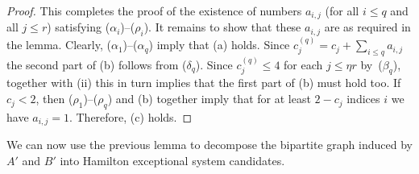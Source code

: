 \documentclass{memo-l}
\numberwithin{section}{chapter}
\numberwithin{equation}{section}
\numberwithin{firstthm}{section}
\numberwithin{figure}{section}
\begin{document}
{\begin{proof}
\medskip

This completes the proof of the existence of numbers $a_{i,j}$ (for all $i\le q$ and all $j\le r$)
satisfying ($\alpha_i$)--($\rho_i$). It remains to show that these $a_{i,j}$ are as required in the lemma.
Clearly, ($\alpha_1$)--($\alpha_q$) imply that (a) holds. Since
$c_j^{(q)}  = c_j + \sum_{i \le q} a_{i,j}$ the second part of (b) follows from ($\delta_q$).
Since $c_j^{(q)}\le 4$ for each $j\le \eta r$ by~($\beta_q$), together with (ii) this in turn implies that the
first part of (b) must hold too. If $c_j < 2$, then ($\rho_1$)--($\rho_q$) and (b) together imply that for at least
$2-c_j$ indices $i$ we have $a_{i,j} = 1$. Therefore, (c) holds.
\end{proof}




We can now use the previous lemma to decompose the bipartite graph induced by $A'$ and $B'$ into 
Hamilton exceptional system candidates. 

}
\end{document}
